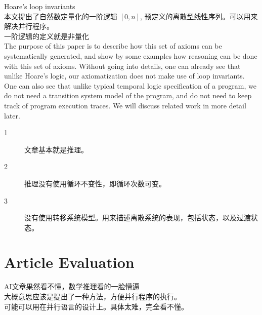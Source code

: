 \documentclass[
10pt, %
a4paper, %
onecolumn, %
portrait %
]{article}
\begin{document}
\begin{CJK*}{UTF8}{gbsn}
 Hoare's  loop invariants
\\ 本文提出了自然数定量化的一阶逻辑  \( [0, n]\), 预定义的离散型线性序列。可以用来解决并行程序。
\\ 一阶逻辑的定义就是非量化
\\ The  purpose  of  this  paper  is  to  describe  how  this  set  of  axioms  can  be  systematically  generated,  and  show  by  some  examples  how  reasoning  can  be  done  with  this  set  of  axioms.  Without  going  into  details,  one  can  already  see  that  unlike  Hoare’s  logic,  our  axiomatization  does  not  make  use  of  loop  invariants.  One  can  also  see  that  unlike  typical  temporal  logic specification  of  a  program,  we  do  not  need  a  transition  system  model  of  the  program,  and  do  not  need  to  keep  track  of  program  execution  traces.  We  will  discuss  related  work  in  more  detail  later.
\begin{description}
\item[1]  文章基本就是推理。
\item[2]  推理没有使用循环不变性，即循环次数可变。
\item[3]  没有使用转移系统模型。用来描述离散系统的表现，包括状态，以及过渡状态。
\end{description}














\section*{Article Evaluation}
AI文章果然看不懂，数学推理看的一脸懵逼
\\ 大概意思应该是提出了一种方法，方便并行程序的执行。
\\ 可能可以用在并行语言的设计上。具体太难，完全看不懂。


\end{CJK*}
\end{document}
